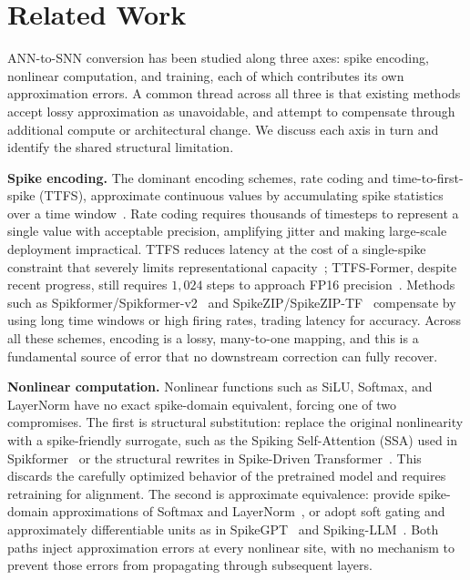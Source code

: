 \documentclass{article}
\theoremstyle{plain}
\theoremstyle{definition}
\theoremstyle{remark}
\begin{document}
\section{Related Work}
\label{sec:related_works}

ANN-to-SNN conversion has been studied along three axes: spike encoding, nonlinear
computation, and training, each of which contributes its own approximation errors.
A common thread across all three is that existing methods accept lossy approximation
as unavoidable, and attempt to compensate through additional compute or architectural
change. We discuss each axis in turn and identify the shared structural limitation.

\noindent\textbf{Spike encoding.}
The dominant encoding schemes, rate coding and time-to-first-spike
(TTFS), approximate continuous values by accumulating spike statistics over a time
window~\citep{rueckauer2017conversion,auge2021encoding,guo2021coding}. Rate coding
requires thousands of timesteps to represent a single value with acceptable precision,
amplifying jitter and making large-scale deployment impractical. TTFS reduces latency
at the cost of a single-spike constraint that severely limits representational
capacity~\citep{bonilla2022ttfs,stanojevic2024ttfs}; TTFS-Former, despite recent
progress, still requires $1{,}024$ steps to approach FP16
precision~\citep{ZhaoHuangDingYu2025_TTFSFormer}. Methods such as
Spikformer/Spikformer-v2~\citep{zhou2023spikformer,zhou2024spikformerv2} and
SpikeZIP/SpikeZIP-TF~\citep{you2024spikeziptf} compensate by using long time windows
or high firing rates, trading latency for accuracy. Across all these schemes, encoding
is a lossy, many-to-one mapping, and this is a fundamental source of error that no
downstream correction can fully recover.

\noindent\textbf{Nonlinear computation.}
Nonlinear functions such as SiLU, Softmax, and LayerNorm have no exact spike-domain
equivalent, forcing one of two compromises. The first is structural substitution:
replace the original nonlinearity with a spike-friendly surrogate, such as the
Spiking Self-Attention (SSA) used in Spikformer~\citep{zhou2023spikformer} or the
structural rewrites in Spike-Driven
Transformer~\citep{yao2023sdt,spikedattention2024,wang2023stsa}. This discards the
carefully optimized behavior of the pretrained model and requires retraining for
alignment. The second is approximate equivalence: provide spike-domain approximations
of Softmax and LayerNorm~\citep{you2024spikeziptf,tang2024sorbet}, or adopt soft
gating and approximately differentiable units as in SpikeGPT~\citep{zhu2023spikegpt}
and Spiking-LLM~\citep{xing2025spikellm}. Both paths inject approximation errors at
every nonlinear site, with no mechanism to prevent those errors from propagating
through subsequent layers.
\end{document}
